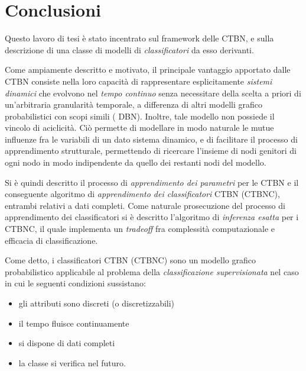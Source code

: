 
\cleardoublepage
{}
{}
\chapter*{Conclusioni}\label{cap:concl}
Questo lavoro di tesi è stato incentrato sul framework delle \acf{CTBN}, e sulla descrizione di una classe di modelli di \emph{classificatori} da esso derivanti.

Come ampiamente descritto e motivato, il principale vantaggio apportato dalle \acs{CTBN} consiste nella loro capacità di rappresentare esplicitamente \emph{sistemi dinamici} che evolvono nel \emph{tempo continuo} senza necessitare della scelta a priori di un'arbitraria granularità temporale, a differenza di altri modelli grafico probabilistici con scopi simili (\eg{} \acl{DBN}). Inoltre, tale modello non possiede il vincolo di aciclicità. Ciò permette di modellare in modo naturale le mutue influenze fra le variabili di un dato sistema dinamico, e di facilitare il processo di apprendimento strutturale, permettendo di ricercare l'insieme di nodi genitori di ogni nodo in modo indipendente da quello dei restanti nodi del modello.

Si è quindi descritto il processo di \emph{apprendimento dei parametri} per le \acs{CTBN} e il conseguente algoritmo di \emph{apprendimento dei classificatori} \acs{CTBN} (\acs{CTBNC}), entrambi relativi a dati completi. Come naturale prosecuzione del processo di apprendimento dei classificatori si è descritto l'algoritmo di \emph{inferenza esatta} per i \acs{CTBNC}, il quale implementa un \emph{tradeoff} fra complessità computazionale e efficacia di classificazione.

Come detto, i classificatori \acs{CTBN} (\acs{CTBNC}) sono un modello grafico probabilistico applicabile al problema della \emph{classificazione supervisionata} nel caso in cui le seguenti condizioni sussistano:
\begin{itemize}
	\item gli attributi sono discreti (o discretizzabili)
	\item il tempo fluisce continuamente
	\item si dispone di dati completi
	\item la classe si verifica nel futuro.
\end{itemize}

